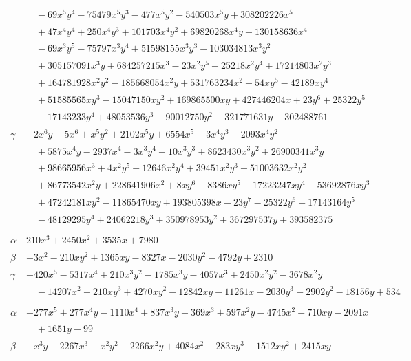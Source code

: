 \documentclass[11pt]{article}
\begin{document}
\begin{longtable}{@{}ll@{}}
 & $\quad -69x^{5}y^{4}-75479x^{5}y^{3}-477x^{5}y^{2}-540503x^{5}y+308202226x^{5}$\\
 & $\quad +47x^{4}y^{4}+250x^{4}y^{3}+101703x^{4}y^{2}+69820268x^{4}y-130158636x^{4}$\\
 & $\quad -69x^{3}y^{5}-75797x^{3}y^{4}+51598155x^{3}y^{3}-103034813x^{3}y^{2}$\\
 & $\quad +305157091x^{3}y+684257215x^{3}-23x^{2}y^{5}-25218x^{2}y^{4}+17214803x^{2}y^{3}$\\
 & $\quad +164781928x^{2}y^{2}-185668054x^{2}y+531763234x^{2}-54xy^{5}-42189xy^{4}$\\
 & $\quad +51585565xy^{3}-15047150xy^{2}+169865500xy+427446204x+23y^{6}+25322y^{5}$\\
 & $\quad -17143233y^{4}+48053536y^{3}-90012750y^{2}-321771631y-302488761$\\
$\gamma$ & $-2x^{6}y-5x^{6}+x^{5}y^{2}+2102x^{5}y+6554x^{5}+3x^{4}y^{3}-2093x^{4}y^{2}$\\
 & $\quad +5875x^{4}y-2937x^{4}-3x^{3}y^{4}+10x^{3}y^{3}+8623430x^{3}y^{2}+26900341x^{3}y$\\
 & $\quad +98665956x^{3}+4x^{2}y^{5}+12646x^{2}y^{4}+39451x^{2}y^{3}+51003632x^{2}y^{2}$\\
 & $\quad +86773542x^{2}y+228641906x^{2}+8xy^{6}-8386xy^{5}-17223247xy^{4}-53692876xy^{3}$\\
 & $\quad +47242181xy^{2}-11865470xy+193805398x-23y^{7}-25322y^{6}+17143164y^{5}$\\
 & $\quad -48129295y^{4}+24062218y^{3}+350978953y^{2}+367297537y+393582375$\\
\addlinespace[3pt]
\multicolumn{2}{@{}l}{$\{i,j\}=\{53,105\}$, $k_{ij}=2\cdot 3^{2}\cdot 5\cdot 7^{3}$}\\
$\alpha$ & $210x^{3}+2450x^{2}+3535x+7980$\\
$\beta$ & $-3x^{2}-210xy^{2}+1365xy-8327x-2030y^{2}-4792y+2310$\\
$\gamma$ & $-420x^{5}-5317x^{4}+210x^{3}y^{2}-1785x^{3}y-4057x^{3}+2450x^{2}y^{2}-3678x^{2}y$\\
 & $\quad -14207x^{2}-210xy^{3}+4270xy^{2}-12842xy-11261x-2030y^{3}-2902y^{2}-18156y+534$\\
\addlinespace[3pt]
\multicolumn{2}{@{}l}{$\{i,j\}=\{53,109\}$, $k_{ij}=2^{6}\cdot 3^{2}\cdot 5$}\\
$\alpha$ & $-277x^{5}+277x^{4}y-1110x^{4}+837x^{3}y+369x^{3}+597x^{2}y-4745x^{2}-710xy-2091x$\\
 & $\quad +1651y-99$\\
$\beta$ & $-x^{3}y-2267x^{3}-x^{2}y^{2}-2266x^{2}y+4084x^{2}-283xy^{3}-1512xy^{2}+2415xy$\\

\end{longtable}
\end{document}
